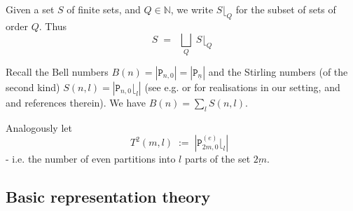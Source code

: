 \documentclass[reqno,10pt,a4paper]{amsart}
\newcommand{\N}{\mathbb{N}}
\newcommand{\beq}{\begin{equation}}
\newcommand{\eq}{\end{equation}}
\newcommand{\red}[1]{\textcolor{red}{#1}}
\newcommand{\ppm}[1]{\red{#1}}
\newcommand{\ppmy}[1]{}   %
\newcommand{\ppmm}[1]{{#1}}
\newcommand{\T}{T^2}  %
\newcommand{\rmP}{{\mathtt P}} %
\newcommand{\rmPe}{{\rmP}^{(e)}} %
\begin{document}



\ppmy{ 
\subsection{Preparatory homological and combinatorial generalities}
$\;$ 
\ppm{[probably just let 1st two items here be at end of previous subsection; and 3rd item be at start of next subsection, so this subsection disappears!]}
}



\newcommand{\siz}{\lfloor}

\mdef 
Given a set $S$ of finite sets, 
and $Q \in \N$,
we write $S\siz_Q$ for the subset of sets of order $Q$. Thus
\beq 
S \;=\;\; \bigsqcup_Q \; S\siz_Q
\eq 


\mdef  \label{de:bell1}
Recall the Bell numbers 
$B(n) = | \rmP_{n,0} | = |\rmP_{\underline{n}}|$
and the Stirling numbers (of the second kind) 
$S(n,l) = | \rmP_{n,0}\siz_l | $
(see e.g. \cite[Ch.8]{Martin91} or \cite{Martin94} for realisations in our setting, and 
\cite{benkart2012planar,benkart2016schur,benkart2017walks} and
references therein). 
We have 
\(
B(n) = \sum_l S(n,l)   .
\)

Analogously let 
$$
\T(m,l) \;  :=  \;
       \left|    %
             \rmPe_{2m,0}\siz_l \right|  \;\;
$$
- i.e. the number of even partitions into $l$ parts of the set $\underline{2m}$.





\subsection{\ppmm{Basic representation theory}} \label{ss:brt}       $\;$ 
\end{document}
